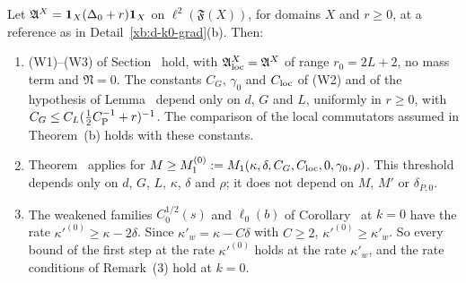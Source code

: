 \begin{detail}[The walks at $k=0$; Proposition~\Nref{prop:first-step}(c)]\label{xb:d-k0-walks}
Let $\mathfrak A^X=\mathbf 1_X(\Delta_0+r)\mathbf 1_X$ on $\ell^2(\mathfrak F(X))$, for domains $X$ and $r\ge0$, at a reference as in Detail~\ref{xb:d-k0-grad}(b). Then:
\begin{enumerate}[label=(\alph*)]
\item (W1)--(W3) of Section~ hold, with $\mathfrak A^X_{\rm loc}=\mathfrak A^X$ of range $r_0=2L+2$, no mass term and $\mathfrak N=0$. The constants $C_G$, $\gamma_0$ and $C_{\rm loc}$ of (W2) and of the hypothesis of Lemma~ depend only on $d$, $G$ and $L$, uniformly in $r\ge0$, with $C_G\le C_L(\frac12C_{\rm P}^{-1}+r)^{-1}$. The comparison of the local commutators assumed in Theorem~(b) holds with these constants.
\item Theorem~ applies for $M\ge M^{(0)}_1:=M_1(\kappa,\delta,C_G,C_{\rm loc},0,\gamma_0,\rho)$. This threshold depends only on $d$, $G$, $L$, $\kappa$, $\delta$ and $\rho$; it does not depend on $M$, $M'$ or $\delta_{P,0}$.
\item The weakened families $C_0^{1/2}(s)$ and $\ell_0(b)$ of Corollary~ at $k=0$ have the rate $\kappa'^{(0)}\ge\kappa-2\delta$. Since $\kappa'_w=\kappa-C\delta$ with $C\ge2$, $\kappa'^{(0)}\ge\kappa'_w$. So every bound of the first step at the rate $\kappa'^{(0)}$ holds at the rate $\kappa'_w$, and the rate conditions of Remark~(3) hold at $k=0$.
\end{enumerate}
\end{detail}

